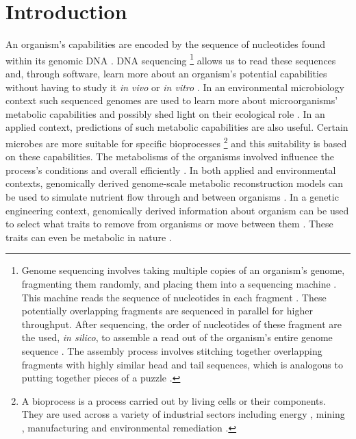 \chapter{Introduction}

An organism's capabilities are encoded by the sequence of nucleotides found within its genomic DNA \cite{crick1970central}. DNA sequencing \footnote{Genome sequencing involves taking multiple copies of an organism's genome, fragmenting them randomly, and placing them into a sequencing machine \cite{shendure2017dna}. This machine reads the sequence of nucleotides in each fragment  \cite{shendure2017dna}. These potentially overlapping fragments are sequenced in parallel for higher throughput. After sequencing, the order of nucleotides of these fragment are the used, \textit{in silico}, to assemble a read out of the organism's entire genome sequence \cite{wajid2012review}. The assembly process involves stitching together overlapping fragments with highly similar head and tail sequences, which is analogous to putting together pieces of a puzzle \cite{wajid2012review}.} allows us to read these sequences and, through software, learn more about an organism's potential capabilities without having to study it \textit{in vivo} or \textit{in vitro} \cite{de2012bioinformatic}. In an environmental microbiology context such sequenced genomes are used to learn more about microorganisms' metabolic capabilities and possibly shed light on their ecological role \cite{de2012bioinformatic}. In an applied context, predictions of such metabolic capabilities are also useful. Certain microbes are more suitable for specific bioprocesses \footnote{A bioprocess is a process carried out by living cells or their components. They are used across a variety of industrial sectors including energy \cite{deublein2011biogas}, mining \cite{dew1997biox}, manufacturing \cite{thodey2014microbial} and environmental remediation \cite{alexander1999biodegradation}.} and this suitability is based on these capabilities. The metabolisms of the organisms involved influence the process's conditions and overall efficiently \cite{doran1995bioprocess,liu2016bioprocess}. In both applied and environmental contexts, genomically derived genome-scale metabolic reconstruction models can be used to simulate nutrient flow through and between organisms \cite{magnusdottir2017generation, arkin2018kbase, faria2018improving}. In a genetic engineering context, genomically derived information about organism can be used to select what traits to remove from organisms or move between them \cite{strohl2001biochemical}. These traits can even be metabolic in nature \cite{sanchez2005novel}.

